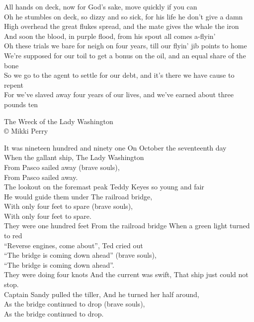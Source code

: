 \documentclass[letterpaper,9pt]{article}
\begin{document}
All hands on deck, now for God's sake, move quickly if you can \\
Oh he stumbles on deck, so dizzy and so sick, for his life he don't give a damn \\
High overhead the great flukes spread, and the mate gives the whale the iron \\
And soon the blood, in purple flood, from his spout all comes a-flyin' \\

Oh these trials we bare for neigh on four years, till our flyin' jib points to home \\
We're supposed for our toil to get a bonus on the oil, and an equal share of the bone \\
So we go to the agent to settle for our debt, and it's there we have cause to repent \\
For we've slaved away four years of our lives, and we've earned about three pounds ten \\

\newpage
{}
\Huge
The Wreck of the Lady Washington\\

\large
© Mikki Perry

It was nineteen hundred and ninety one On October the seventeenth day \\
When the gallant ship, The Lady Washington \\
From Pasco sailed away (brave souls), \\
From Pasco sailed away. \\

The lookout on the foremast peak Teddy Keyes so young and fair \\
He would guide them under The railroad bridge, \\
With only four feet to spare (brave souls), \\
With only four feet to spare. \\

They were one hundred feet From the railroad bridge When a green light turned to red \\
“Reverse engines, come about”, Ted cried out \\
“The bridge is coming down ahead” (brave souls), \\
“The bridge is coming down ahead”. \\

They were doing four knots And the current was swift, That ship just could not stop. \\
Captain Sandy pulled the tiller, And he turned her half around, \\
As the bridge continued to drop (brave souls), \\
As the bridge continued to drop. \\
\end{document}

